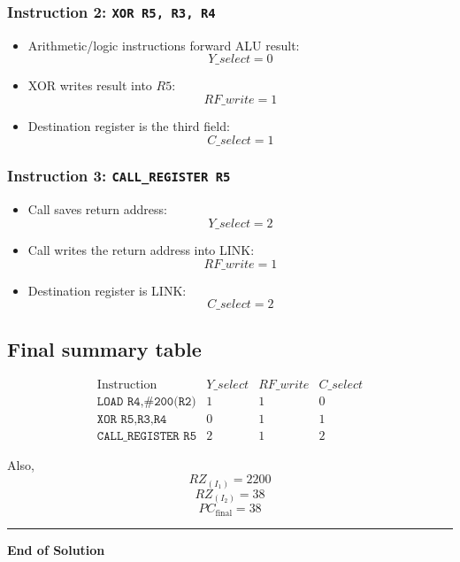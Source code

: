 \documentclass[12pt,a4paper]{article}
\begin{document}
\subsubsection*{Instruction 2: \texttt{XOR R5, R3, R4}}

\begin{itemize}[leftmargin=2em]
    \item Arithmetic/logic instructions forward ALU result:
    \[
    \boxed{Y\_select = 0}
    \]
    \item XOR writes result into \(R5\):
    \[
    \boxed{RF\_write = 1}
    \]
    \item Destination register is the third field:
    \[
    \boxed{C\_select = 1}
    \]
\end{itemize}

\subsubsection*{Instruction 3: \texttt{CALL\_REGISTER R5}}

\begin{itemize}[leftmargin=2em]
    \item Call saves return address:
    \[
    \boxed{Y\_select = 2}
    \]
    \item Call writes the return address into LINK:
    \[
    \boxed{RF\_write = 1}
    \]
    \item Destination register is LINK:
    \[
    \boxed{C\_select = 2}
    \]
\end{itemize}

\subsection*{Final summary table}

\[
\boxed{
\begin{array}{c|c|c|c}
\text{Instruction} & Y\_select & RF\_write & C\_select \\
\hline
\texttt{LOAD R4,\#200(R2)} & 1 & 1 & 0 \\
\texttt{XOR R5,R3,R4} & 0 & 1 & 1 \\
\texttt{CALL\_REGISTER R5} & 2 & 1 & 2
\end{array}}
\]

Also,
\[
\boxed{RZ_{(I_1)} = 2200}
\]
\[
\boxed{RZ_{(I_2)} = 38}
\]
\[
\boxed{PC_{\text{final}} = 38}
\]

\vspace{1em}
\hrule
\vspace{0.5em}

\begin{center}
    \textbf{End of Solution}
\end{center}
\end{document}
